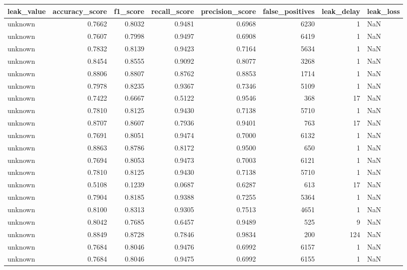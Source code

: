 \begin{tabular}{lrrrrrrl}
\toprule
leak\_value & accuracy\_score & f1\_score & recall\_score & precision\_score & false\_positives & leak\_delay & leak\_loss \\
\midrule
unknown & 0.7662 & 0.8032 & 0.9481 & 0.6968 & 6230 & 1 & NaN \\
unknown & 0.7607 & 0.7998 & 0.9497 & 0.6908 & 6419 & 1 & NaN \\
unknown & 0.7832 & 0.8139 & 0.9423 & 0.7164 & 5634 & 1 & NaN \\
unknown & 0.8454 & 0.8555 & 0.9092 & 0.8077 & 3268 & 1 & NaN \\
unknown & 0.8806 & 0.8807 & 0.8762 & 0.8853 & 1714 & 1 & NaN \\
unknown & 0.7978 & 0.8235 & 0.9367 & 0.7346 & 5109 & 1 & NaN \\
unknown & 0.7422 & 0.6667 & 0.5122 & 0.9546 & 368 & 17 & NaN \\
unknown & 0.7810 & 0.8125 & 0.9430 & 0.7138 & 5710 & 1 & NaN \\
unknown & 0.8707 & 0.8607 & 0.7936 & 0.9401 & 763 & 17 & NaN \\
unknown & 0.7691 & 0.8051 & 0.9474 & 0.7000 & 6132 & 1 & NaN \\
unknown & 0.8863 & 0.8786 & 0.8172 & 0.9500 & 650 & 1 & NaN \\
unknown & 0.7694 & 0.8053 & 0.9473 & 0.7003 & 6121 & 1 & NaN \\
unknown & 0.7810 & 0.8125 & 0.9430 & 0.7138 & 5710 & 1 & NaN \\
unknown & 0.5108 & 0.1239 & 0.0687 & 0.6287 & 613 & 17 & NaN \\
unknown & 0.7904 & 0.8185 & 0.9388 & 0.7255 & 5364 & 1 & NaN \\
unknown & 0.8100 & 0.8313 & 0.9305 & 0.7513 & 4651 & 1 & NaN \\
unknown & 0.8042 & 0.7685 & 0.6457 & 0.9489 & 525 & 9 & NaN \\
unknown & 0.8849 & 0.8728 & 0.7846 & 0.9834 & 200 & 124 & NaN \\
unknown & 0.7684 & 0.8046 & 0.9476 & 0.6992 & 6157 & 1 & NaN \\
unknown & 0.7684 & 0.8046 & 0.9475 & 0.6992 & 6155 & 1 & NaN \\
\bottomrule
\end{tabular}
